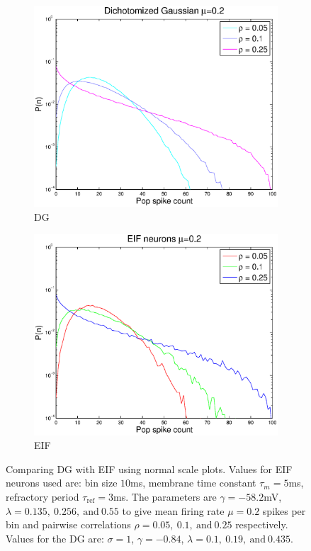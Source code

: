 \documentclass[11pt]{article}
\begin{document}
\begin{figure}[H]
	\begin{subfigure}[h]{0.5\textwidth}
	\centering
	\includegraphics[width=\textwidth]{../Figures/DG/DG_Macke_2a_mu_02_semilog}
	\caption{DG}
	\label{fig7}
	\end{subfigure}
	\begin{subfigure}[h]{0.5\textwidth}
	\centering
	\includegraphics[width=\textwidth]{../Figures/EIF/EIF_Macke_2a_mu_02_semilog}
	\caption{EIF}
	\label{fig8}
	\end{subfigure}
	\caption{\footnotesize Comparing DG with EIF using normal scale plots. Values for EIF neurons used are: bin size $10$ms, membrane time constant $\tau_m = 5$ms, refractory period $\tau_\text{ref} = 3$ms. The parameters are $\gamma = -58.2$mV, $\lambda = 0.135,~0.256,~\text{and}~0.55$ to give mean firing rate $\mu = 0.2$ spikes per bin and pairwise correlations $\rho = 0.05,~0.1,~\text{and}~0.25$ respectively. Values for the DG are: $\sigma = 1$, $\gamma = -0.84$, $\lambda = 0.1,~0.19,~\text{and}~0.435$.}
\end{figure}
\end{document}
